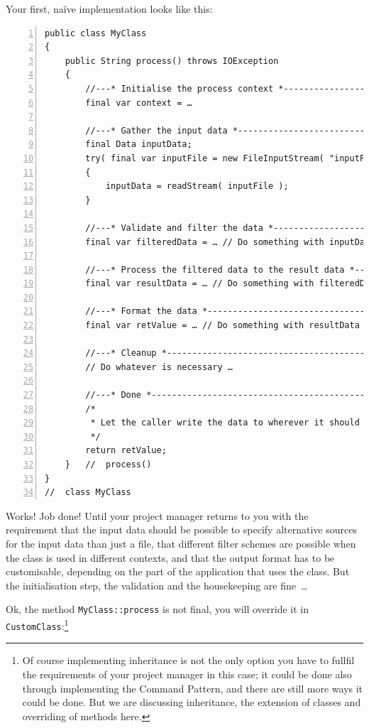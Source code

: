 \documentclass[11pt,a4paper, titlepage, parskip=half, headsepline, footsepline, cleardoublepage=current, headheight=1cm]{scrbook}
\begin{document}
Your first, naïve implementation looks like this:
\begin{lstlisting}[numbers=left]
public class MyClass
{
    public String process() throws IOException
    {
        //---* Initialise the process context *----------------------
        final var context = …
        
        //---* Gather the input data *-------------------------------
        final Data inputData;
        try( final var inputFile = new FileInputStream( "inputFileName" ) )
        {
            inputData = readStream( inputFile );
        }
        
        //---* Validate and filter the data *------------------------
        final var filteredData = … // Do something with inputData
        
        //---* Process the filtered data to the result data *--------
        final var resultData = … // Do something with filteredData
        
        //---* Format the data *-------------------------------------
        final var retValue = … // Do something with resultData
        
        //---* Cleanup *---------------------------------------------
        // Do whatever is necessary …
        
        //---* Done *------------------------------------------------
        /*
         * Let the caller write the data to wherever it should end up.
         */
        return retValue; 
    }   //  process()
}
//  class MyClass
\end{lstlisting}
Works! Job done! Until your project manager returns to you with the requirement that the input data should be possible to specify alternative sources for the input data than just a file, that different filter schemes are possible when the class is used in different contexts, and that the output format has to be customisable, depending on the part of the application that uses the class. But the initialisation step, the validation and the housekeeping are fine~…

Ok, the method \lstinline|MyClass::process| is not final, you will override it in \lstinline|CustomClass|:\footnote{Of course implementing inheritance is not the only option you have to fullfil the requirements of your project manager in this case; it could be done also through implementing the Command Pattern\autocite{Gamma:DesignPatterns}, and there are still more ways it could be done. But we are discussing inheritance, the extension of classes and overriding of methods here.} 
\end{document}
